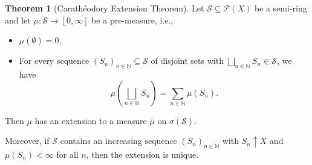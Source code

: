 \documentclass[12pt]{article}
\theoremstyle{definition}
\newtheorem{theorem}{Theorem}[section]
\begin{document}
\medskip
\begin{theorem}[Carathéodory Extension Theorem]
Let $\mathcal{S} \subseteq \mathcal{P}(X)$ be a semi-ring and let $\mu : \mathcal{S} \to [0,\infty]$ be a pre-measure, i.e.,
\begin{itemize}
    \item $\mu(\emptyset) = 0$,
    \item For every sequence $(S_n)_{n \in \mathbb{N}} \subseteq \mathcal{S}$ of disjoint sets with $\bigsqcup_{n \in \mathbb{N}} S_n \in \mathcal{S}$, we have
    \[
    \mu\left( \bigsqcup_{n \in \mathbb{N}} S_n \right) = \sum_{n \in \mathbb{N}} \mu(S_n).
    \]
\end{itemize}
Then $\mu$ has an extension to a measure $\bar{\mu}$ on $\sigma(\mathcal{S})$.

Moreover, if $\mathcal{S}$ contains an increasing sequence $(S_n)_{n \in \mathbb{N}}$ with $S_n \uparrow X$ and $\mu(S_n) < \infty$ for all $n$, then the extension is unique.
\end{theorem}
\end{document}
